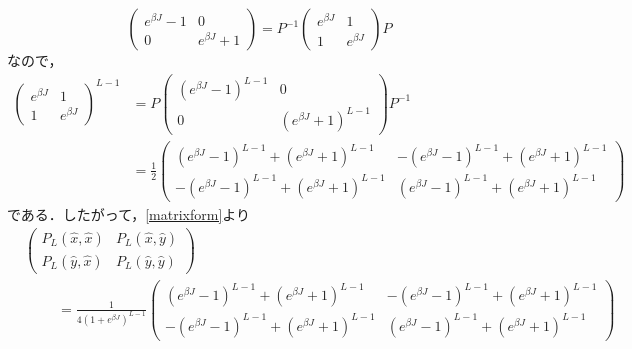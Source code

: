 \documentclass[a4paper,pdflatex,ja=standard]{bxjsarticle}
\begin{document}
\begin{enumerate}
\begin{equation}
    \begin{pmatrix}
      e^{\beta J}-1 & 0 \\
      0 & e^{\beta J}+1
    \end{pmatrix}
    =
    P^{-1}
    \begin{pmatrix}
      e^{\beta J} & 1 \\
      1 & e^{\beta J}
    \end{pmatrix}
    P
  \end{equation}
  なので，
  \begin{align*}
    \begin{pmatrix}
      e^{\beta J} & 1 \\
      1 & e^{\beta J}
    \end{pmatrix}^{L-1}
    &=
    P
    \begin{pmatrix}
      (e^{\beta J}-1)^{L-1} & 0 \\
      0 & (e^{\beta J}+1)^{L-1}
    \end{pmatrix}
    P^{-1}
    \nonumber
    \\
    &=
    \frac{1}{2}
    \begin{pmatrix}
      (e^{\beta J}-1)^{L-1}
      +
      (e^{\beta J}+1)^{L-1}
      &
      -(e^{\beta J}-1)^{L-1}
      +
      (e^{\beta J}+1)^{L-1}
      \\
      -(e^{\beta J}-1)^{L-1}
      +
      (e^{\beta J}+1)^{L-1}
      &
      (e^{\beta J}-1)^{L-1}
      +
      (e^{\beta J}+1)^{L-1}
    \end{pmatrix}
  \end{align*}
  である．したがって，\eqref{matrixform}より
  \begin{align}
    &
    \begin{pmatrix}
      P_{L}(\hat{x},\hat{x}) & P_{L}(\hat{x},\hat{y}) \\
      P_{L}(\hat{y},\hat{x}) & P_{L}(\hat{y},\hat{y})
    \end{pmatrix}
    \nonumber
    \\
    &\hspace{1cm}
    =
    \frac{1}{4(1+e^{\beta J})^{L-1}}
    \begin{pmatrix}
      (e^{\beta J}-1)^{L-1}
      +
      (e^{\beta J}+1)^{L-1}
      &
      -(e^{\beta J}-1)^{L-1}
      +
      (e^{\beta J}+1)^{L-1}
      \\
      -(e^{\beta J}-1)^{L-1}
      +
      (e^{\beta J}+1)^{L-1}
      &
      (e^{\beta J}-1)^{L-1}
      +
      (e^{\beta J}+1)^{L-1}
    \end{pmatrix}
  \end{align}

\end{enumerate}
\end{document}
